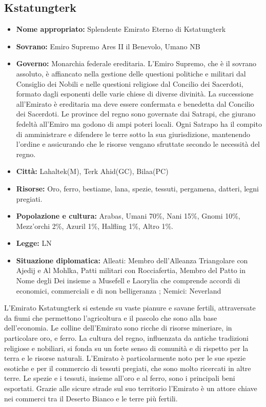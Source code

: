 \documentclass[10pt, a4paper]{report}
\begin{document}
\begin{multicols}{2}
\subsection*{Kstatungterk}
\begin{itemize}
	\item \textbf{Nome appropriato:} Splendente Emirato Eterno di Kstatungterk
	\item \textbf{Sovrano:} Emiro Supremo Ares II il Benevolo, Umano NB
	\item \textbf{Governo:}  Monarchia federale ereditaria. L'Emiro Supremo, che è il sovrano assoluto, è affiancato nella gestione delle questioni politiche e militari dal Consiglio dei Nobili e nelle questioni religiose dal Concilio dei Sacerdoti, formato dagli esponenti delle varie chiese di diverse divinità. La successione all’Emirato è ereditaria ma deve essere confermata e benedetta dal Concilio dei Sacerdoti. Le province del regno sono governate dai Satrapi, che giurano fedeltà all'Emiro ma godono di ampi poteri locali. Ogni Satrapo ha il compito di amministrare e difendere le terre sotto la sua giurisdizione, mantenendo l'ordine e assicurando che le risorse vengano sfruttate secondo le necessità del regno.
	\item \textbf{Città:} Lahaltek(M), Terk Ahid(GC), Bilaa(PC)
	\item \textbf{Risorse:} Oro, ferro, bestiame, lana, spezie, tessuti, pergamena, datteri, legni pregiati.
	\item \textbf{Popolazione e cultura:} Arabas, Umani 70\%, Nani 15\%, Gnomi 10\%, Mezz'orchi 2\%, Azuril 1\%, Halfling 1\%, Altro 1\%.
	\item \textbf{Legge:} LN
	\item \textbf{Situazione diplomatica:} Alleati: Membro dell'Alleanza Triangolare con Ajedij e  Al Mohlka, Patti militari con Rocciafertia, Membro del Patto in Nome degli Dei insieme a Musefell e Laorylia che comprende accordi di economici, commerciali e di non belligeranza ; Nemici: Neverland
\end{itemize}
L'Emirato Kstatungterk si estende su vaste pianure e savane fertili, attraversate da fiumi che permettono l’agricoltura e il pascolo che sono alla base dell'economia. Le colline dell'Emirato sono ricche di risorse mineriare, in particolare oro, e ferro. La cultura del regno, influenzata da antiche tradizioni religiose e nobiliari, si fonda su un forte senso di comunità e di rispetto per la terra e le risorse naturali.
L'Emirato è particolarmente noto per le sue spezie esotiche e per il commercio di tessuti pregiati, che sono molto ricercati in altre terre. Le spezie e i tessuti, insieme all'oro e al ferro, sono i principali beni esportati. Grazie alle sicure strade sul suo territorio l'Emirato è un attore chiave nei commerci tra il Deserto Bianco e le terre più fertili.

\end{multicols}
\end{document}
